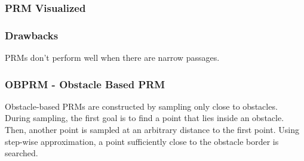 \documentclass{beamer}
\begin{document}
  \begin{frame}
    \frametitle{PRM Visualized}
  
  \end{frame}

  \begin{frame}
    \frametitle{Drawbacks}
    PRMs don’t perform well when there are narrow passages.
  
  \end{frame}

  \begin{frame}
    \frametitle{OBPRM - Obstacle Based PRM}
    Obstacle-based PRMs are constructed by sampling only close to
obstacles. During sampling, the first goal is to find a point that
lies inside an obstacle. Then, another point is sampled at an
arbitrary distance to the first point. Using step-wise approximation, a point sufficiently close to the obstacle border is searched.
  
  \end{frame}
\end{document}
